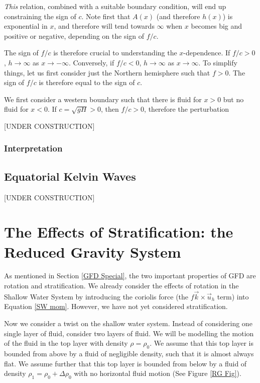 \textit{This} relation, combined with a suitable boundary condition, will end up constraining the sign of \(c\). Note first that \(A(x)\) (and therefore \(h(x)\)) is exponential in \(x\), and therefore will tend towards \(\infty\) when \(x\) becomes big and positive or negative, depending on the sign of \(f/c\).

The sign of \(f/c\) is therefore crucial to understanding the \(x\)-dependence. If \(f/c>0\), \(h\to\infty\) as \(x\to -\infty\). Conversely, if \(f/c<0\), \(h\to\infty\) as \(x\to\infty\). To simplify things, let us first consider just the Northern hemisphere such that \(f>0\). The sign of \(f/c\) is therefore equal to the sign of \(c\).

We first consider a western boundary such that there is fluid for \(x>0\) but no fluid for \(x<0\). If \(c=\sqrt{gH}>0\), then \(f/c>0\), therefore the perturbation 

[UNDER CONSTRUCTION]

\subsubsection{Interpretation}



\subsection{Equatorial Kelvin Waves}

[UNDER CONSTRUCTION]

\section{The Effects of Stratification: the Reduced Gravity System}\label{s Reduced Gravity}

As mentioned in Section \ref{GFD Special}, the two important properties of GFD are rotation and stratification. We already consider the effects of rotation in the Shallow Water System by introducing the coriolis force (the \(f\vec{k}\times\vec{u}_h\) term) into Equation \ref{SW mom}. However, we have not yet considered stratification.

Now we consider a twist on the shallow water system. Instead of considering one single layer of fluid, consider two layers of fluid. We will be modelling the motion of the fluid in the top layer with density \(\rho=\rho_0\). We assume that this top layer is bounded from above by a fluid of negligible density, such that it is almost always flat. We assume further that this top layer is bounded from below by a fluid of density \(\rho_1=\rho_0+\Delta \rho_0\) with no horizontal fluid motion (See Figure \ref{RG Fig}).

